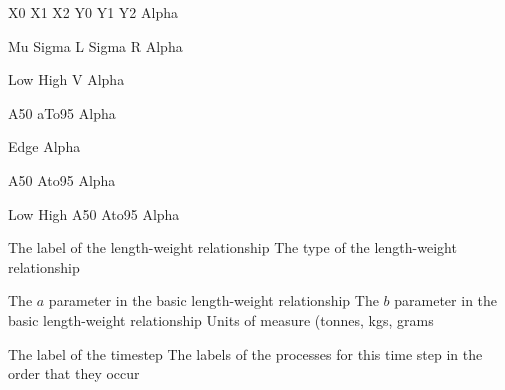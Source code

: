  {X0}
 {X1}
 {X2}
 {Y0}
 {Y1}
 {Y2}
 {Alpha}
\par\textbf{}\par
{} {Mu}
 {Sigma L}
 {Sigma R}
 {Alpha}
\par\textbf{}\par
{} {Low}
 {High}
 {V}
 {Alpha}
\par\textbf{}\par
{} {A50}
 {aTo95}
 {Alpha}
\par\textbf{}\par
{} {Edge}
 {Alpha}
\par\textbf{}\par
{} {A50}
 {Ato95}
 {Alpha}
\par\textbf{}\par
{} {Low}
 {High}
 {A50}
 {Ato95}
 {Alpha}
\par\par
{} {The label of the length-weight relationship}
 {The type of the length-weight relationship}
\par\textbf{}\par
{} {The $a$ parameter in the basic length-weight relationship}
 {The $b$ parameter in the basic length-weight relationship}
 {Units of measure (tonnes, kgs, grams}
\par\textbf{}\par
{}\par\par
{} {The label of the timestep}
 {The labels of the processes for this time step in the order that they occur}
